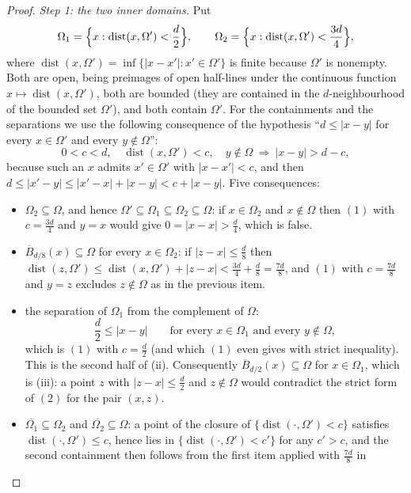 \begin{proof}
\emph{Step 1: the two inner domains.}  Put
\[
\Omega_1=\Bigl\{x:\operatorname{dist}(x,\Omega')<\frac d2\Bigr\},
\qquad
\Omega_2=\Bigl\{x:\operatorname{dist}(x,\Omega')<\frac{3d}4\Bigr\},
\]
where $\operatorname{dist}(x,\Omega')=\inf\{|x-x'|:x'\in\Omega'\}$ is finite
because $\Omega'$ is nonempty.  Both are open, being preimages of open
half-lines under the continuous function
$x\mapsto\operatorname{dist}(x,\Omega')$, both are bounded (they are contained
in the $d$-neighbourhood of the bounded set $\Omega'$), and both contain
$\Omega'$.  For the containments and the separations we use the following
consequence of the hypothesis ``$d\le|x-y|$ for every $x\in\Omega'$ and every
$y\notin\Omega$'':
\[
0<c<d,\quad \operatorname{dist}(x,\Omega')<c,\quad y\notin\Omega
\ \Longrightarrow\ |x-y|>d-c ,
\tag{1}
\]
because such an $x$ admits $x'\in\Omega'$ with $|x-x'|<c$, and then
$d\le|x'-y|\le|x'-x|+|x-y|<c+|x-y|$.  Five consequences:
\begin{itemize}
\item $\Omega_2\subseteq\Omega$, and hence
  $\Omega'\subseteq\Omega_1\subseteq\Omega_2\subseteq\Omega$: if
  $x\in\Omega_2$ and $x\notin\Omega$ then $(1)$ with $c=\frac{3d}4$ and $y=x$
  would give $0=|x-x|>\frac d4$, which is false.
\item $\overline B_{d/8}(x)\subseteq\Omega$ for every $x\in\Omega_2$: if
  $|z-x|\le\frac d8$ then
  $\operatorname{dist}(z,\Omega')\le\operatorname{dist}(x,\Omega')+|z-x|
  <\frac{3d}4+\frac d8=\frac{7d}8$, and $(1)$ with $c=\frac{7d}8$ and $y=z$
  excludes $z\notin\Omega$ as in the previous item.
\item the separation of $\Omega_1$ from the complement of $\Omega$:
  \[
  \frac d2\le|x-y|\qquad\text{for every }x\in\Omega_1
  \text{ and every }y\notin\Omega ,
  \tag{2}
  \]
  which is $(1)$ with $c=\frac d2$ (and which $(1)$ even gives with strict
  inequality).  This is the second half of (ii).  Consequently
  $\overline B_{d/2}(x)\subseteq\Omega$ for $x\in\Omega_1$, which is (iii): a
  point $z$ with $|z-x|\le\frac d2$ and $z\notin\Omega$ would contradict the
  strict form of $(2)$ for the pair $(x,z)$.
\item $\overline{\Omega_1}\subseteq\Omega_2$ and
  $\overline{\Omega_2}\subseteq\Omega$: a point of the closure of
  $\{\operatorname{dist}(\cdot,\Omega')<c\}$ satisfies
  $\operatorname{dist}(\cdot,\Omega')\le c$, hence lies in
  $\{\operatorname{dist}(\cdot,\Omega')<c'\}$ for any $c'>c$, and the second
  containment then follows from the first item applied with $\frac{7d}8$ in

\end{itemize}
\end{proof}
